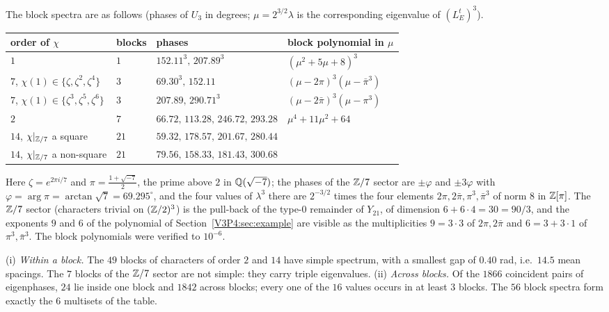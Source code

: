 \begin{remark}\label{V3P4:rem:blocks}
The block spectra are as follows (phases of $U_3$ in degrees; $\mu=2^{3/2}\lambda$ is the
corresponding eigenvalue of $(L_E^{t})^{3}$).
\begin{center}
\begin{tabular}{llll}
\toprule
order of $\chi$ & blocks & phases & block polynomial in $\mu$\\
\midrule
$1$ & $1$ & $152.11^{3},\,207.89^{3}$ & $(\mu^{2}+5\mu+8)^{3}$\\
$7$, $\chi(1)\in\{\zeta,\zeta^{2},\zeta^{4}\}$ & $3$ & $69.30^{3},\,152.11$ & $(\mu-2\pi)^{3}(\mu-\bar\pi^{3})$\\
$7$, $\chi(1)\in\{\zeta^{3},\zeta^{5},\zeta^{6}\}$ & $3$ & $207.89,\,290.71^{3}$ & $(\mu-2\bar\pi)^{3}(\mu-\pi^{3})$\\
$2$ & $7$ & $66.72,\,113.28,\,246.72,\,293.28$ & $\mu^{4}+11\mu^{2}+64$\\
$14$, $\chi|_{\mathbb{Z}/7}$ a square & $21$ & $59.32,\,178.57,\,201.67,\,280.44$ & \\
$14$, $\chi|_{\mathbb{Z}/7}$ a non-square & $21$ & $79.56,\,158.33,\,181.43,\,300.68$ & \\
\bottomrule
\end{tabular}
\end{center}
Here $\zeta=e^{2\pi i/7}$ and $\pi=\frac{1+\sqrt{-7}}2$, the prime above $2$ in
$\mathbb{Q}(\sqrt{-7})$; the phases of the $\mathbb{Z}/7$ sector are $\pm\varphi$ and $\pm3\varphi$ with
$\varphi=\arg\pi=\arctan\sqrt7=69.295^\circ$, and the four values of $\lambda^{3}$ there are
$2^{-3/2}$ times the four elements $2\pi,2\bar\pi,\pi^{3},\bar\pi^{3}$ of norm $8$ in
$\mathbb{Z}[\pi]$. The $\mathbb{Z}/7$ sector (characters trivial on $(\mathbb{Z}/2)^{3}$) is the pull-back of the type-$0$
remainder of $Y_{21}$, of dimension $6+6\cdot4=30=90/3$, and the exponents $9$ and $6$ of the
polynomial of Section~\ref{V3P4:sec:example} are visible as the multiplicities $9=3\cdot3$ of
$2\pi,2\bar\pi$ and $6=3+3\cdot1$ of $\pi^{3},\bar\pi^{3}$. The block polynomials were verified
to $10^{-6}$.

(i) \emph{Within a block.} The $49$ blocks of characters of order $2$ and $14$ have simple
spectrum, with a smallest gap of $0.40$ rad, i.e.\ $14.5$ mean spacings. The $7$ blocks of the
$\mathbb{Z}/7$ sector are not simple: they carry triple eigenvalues. (ii) \emph{Across blocks.} Of the
$1866$ coincident pairs of eigenphases, $24$ lie inside one block and $1842$ across blocks; every
one of the $16$ values occurs in at least $3$ blocks. The $56$ block spectra form exactly the $6$
multisets of the table.
\end{remark}

